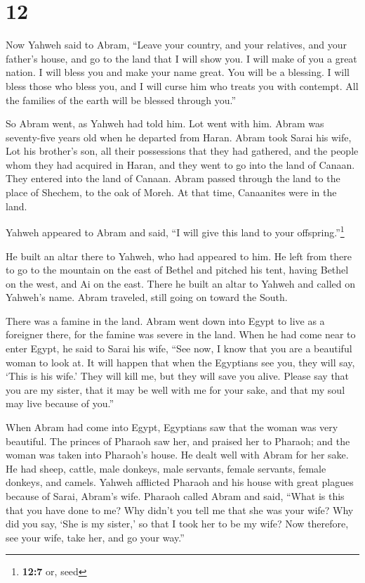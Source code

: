 \hypertarget{section-11}{%
\section{12}\label{section-11}}

 Now Yahweh said to Abram, ``Leave your country, and your
relatives, and your father's house, and go to the land that I will show
you.  I will make of you a great nation. I will bless you
and make your name great. You will be a blessing.  I will
bless those who bless you, and I will curse him who treats you with
contempt. All the families of the earth will be blessed through you.''

 So Abram went, as Yahweh had told him. Lot went with him.
Abram was seventy-five years old when he departed from Haran.
 Abram took Sarai his wife, Lot his brother's son, all
their possessions that they had gathered, and the people whom they had
acquired in Haran, and they went to go into the land of Canaan. They
entered into the land of Canaan.  Abram passed through the
land to the place of Shechem, to the oak of Moreh. At that time,
Canaanites were in the land.

 Yahweh appeared to Abram and said, ``I will give this
land to your offspring.''\footnote{\textbf{12:7} or, seed}

He built an altar there to Yahweh, who had appeared to him.
 He left from there to go to the mountain on the east of
Bethel and pitched his tent, having Bethel on the west, and Ai on the
east. There he built an altar to Yahweh and called on Yahweh's name.
 Abram traveled, still going on toward the South.

 There was a famine in the land. Abram went down into
Egypt to live as a foreigner there, for the famine was severe in the
land.  When he had come near to enter Egypt, he said to
Sarai his wife, ``See now, I know that you are a beautiful woman to look
at.  It will happen that when the Egyptians see you, they
will say, `This is his wife.' They will kill me, but they will save you
alive.  Please say that you are my sister, that it may be
well with me for your sake, and that my soul may live because of you.''

 When Abram had come into Egypt, Egyptians saw that the
woman was very beautiful.  The princes of Pharaoh saw
her, and praised her to Pharaoh; and the woman was taken into Pharaoh's
house.  He dealt well with Abram for her sake. He had
sheep, cattle, male donkeys, male servants, female servants, female
donkeys, and camels.  Yahweh afflicted Pharaoh and his
house with great plagues because of Sarai, Abram's wife. 
Pharaoh called Abram and said, ``What is this that you have done to me?
Why didn't you tell me that she was your wife?  Why did
you say, `She is my sister,' so that I took her to be my wife? Now
therefore, see your wife, take her, and go your way.''

